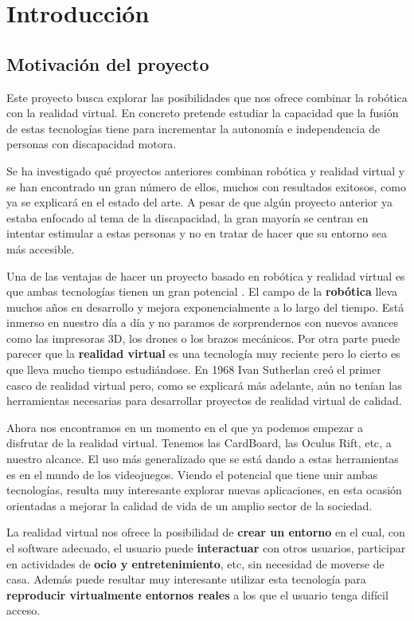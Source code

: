 \documentclass[twoside, 11pt]{epstfg}
\begin{document}
\printnoidxglossaries
\mainmatter
\chapter{Introducción} 


\section{Motivación del proyecto}

Este proyecto busca explorar las posibilidades que nos ofrece combinar la robótica con la realidad virtual. En concreto pretende estudiar la capacidad que la fusión de estas tecnologías tiene para incrementar la autonomía e independencia de personas con discapacidad motora.

Se ha investigado qué proyectos anteriores combinan robótica y realidad virtual y se han encontrado un gran número de ellos, muchos con resultados exitosos, como ya se explicará en el estado del arte. A pesar de que algún proyecto anterior ya estaba enfocado al tema de la discapacidad, la gran mayoría se centran en intentar estimular a estas personas y no en tratar de hacer que su entorno sea más accesible.

Una de las ventajas de hacer un proyecto basado en robótica y realidad virtual es que ambas tecnologías tienen un gran potencial \cite{tahriri2015optimizing}.
El campo de la \textbf{robótica} lleva muchos años en desarrollo y mejora exponencialmente a lo largo del tiempo. Está inmerso en nuestro día a día y no paramos de sorprendernos con nuevos avances como las impresoras 3D, los drones o los brazos mecánicos.
Por otra parte puede parecer que la \textbf{realidad virtual} es una tecnología muy reciente pero lo cierto es que  lleva mucho tiempo estudiándose. En 1968 Ivan Sutherlan creó el primer casco de realidad virtual pero, como se explicará más adelante, aún no tenían las herramientas necesarias para desarrollar proyectos de realidad virtual de calidad.

Ahora nos encontramos en un momento en el que ya podemos empezar a disfrutar de la realidad virtual. Tenemos las CardBoard, las Oculus Rift, etc, a nuestro alcance.
El uso más generalizado que se está dando a estas herramientas es en el mundo de los videojuegos.
Viendo el potencial que tiene unir ambas tecnologías, resulta muy interesante explorar nuevas aplicaciones, en esta ocasión orientadas a mejorar la calidad de vida de un amplio sector de la sociedad.


La realidad virtual nos ofrece la posibilidad de \textbf{crear un entorno} en el cual, con el software adecuado, el usuario puede \textbf{interactuar} con otros usuarios, participar en actividades de \textbf{ocio y entretenimiento}, etc, sin necesidad de moverse de casa.
Además puede resultar muy interesante utilizar esta tecnología para \textbf{reproducir virtualmente entornos reales} a los que el usuario tenga difícil acceso.
\end{document}
